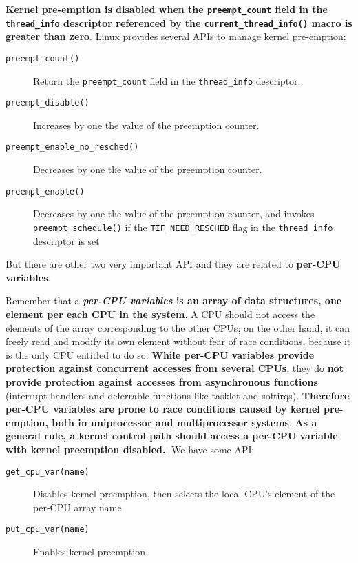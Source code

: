 \documentclass[10pt,a4paper]{article}
\begin{document}
\textbf{Kernel pre-emption is disabled when the \texttt{preempt\_count} field in the \texttt{thread\_info} descriptor referenced by the \texttt{current\_thread\_info()} macro \textbf{is greater than zero}}. Linux provides several APIs to manage kernel pre-emption:
\begin{description}
\item[\texttt{preempt\_count()}] Return the \texttt{preempt\_count} field in the \texttt{thread\_info} descriptor.
\item[\texttt{preempt\_disable()}] Increases by one the value of the preemption counter.
\item[\texttt{preempt\_enable\_no\_resched()}] Decreases by one the value of the preemption counter.
\item[\texttt{preempt\_enable()}] Decreases by one the value of the preemption counter, and invokes \texttt{preempt\_schedule()} if the \texttt{TIF\_NEED\_RESCHED} flag in the \texttt{thread\_info} descriptor is set
\end{description}

But there are other two very important API and they are related to \textbf{per-CPU variables}. 

Remember that a \textbf{\textit{per-CPU variables} is an array of data structures, one element per each CPU in the system}. A CPU should not access the elements of the array corresponding to the other CPUs; on the other hand, it can freely read and modify its own element without fear of race conditions, because it is the only CPU entitled to do so. \textbf{While per-CPU variables provide protection against concurrent accesses from several CPUs}, they do \textbf{not provide protection against accesses from asynchronous functions} (interrupt handlers and deferrable functions like tasklet and softirqs). \textbf{Therefore per-CPU variables are prone to race conditions caused by kernel pre-emption, both in uniprocessor and multiprocessor systems}. \textbf{As a general rule, a kernel control path should access a per-CPU variable with kernel preemption disabled.}. We have some API:

\begin{description}
\item[\texttt{get\_cpu\_var(name)}] Disables kernel preemption, then selects the local CPU’s element of the per-CPU array name
\item[\texttt{put\_cpu\_var(name)}] Enables kernel preemption.
\end{description}
\end{document}
